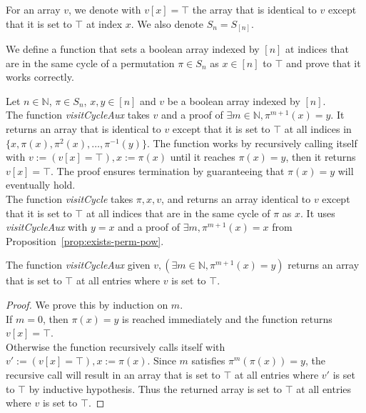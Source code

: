 For an array $v$, we denote with $v[x] = \top$ the array that is identical to $v$ except that it is set to $\top$ at index $x$. We also denote $S_n = S_{[n]}$.

We define a function that sets a boolean array indexed by $[n]$ at indices that are in the same cycle of a permutation $\pi \in S_n$ as $x \in [n]$ to $\top$ and prove that it works correctly.

\begin{definition}
  \label{def:visitCycle}
  \leanok
  Let $n \in \mathbb{N}$, $\pi \in S_n$, $x, y \in [n]$ and $v$ be a boolean array indexed by $[n]$.\\ 
  The function \emph{visitCycleAux} takes $v$ and a proof of $\exists m \in \mathbb{N}, \pi^{m + 1}(x) = y$. It returns an array that is identical to $v$ except that it is set to $\top$ at all indices in $\{x, \pi(x), \pi^2(x), \dots, \pi^{-1}(y)\}$. The function works by recursively calling itself with $v := (v[x] = \top), x := \pi(x)$ until it reaches $\pi(x) = y$, then it returns $v[x] = \top$. The proof ensures termination by guaranteeing that $\pi(x) = y$ will eventually hold.\\
  The function \emph{visitCycle} takes $\pi, x, v$, and returns an array identical to $v$ except that it is set to $\top$ at all indices that are in the same cycle of $\pi$ as $x$. It uses \emph{visitCycleAux} with $y = x$ and a proof of $\exists m, \pi^{m + 1}(x) = x$ from Proposition~\ref{prop:exists-perm-pow}.
\end{definition}

\begin{proposition}
  \label{prop:visitCycleAux-get!-true-of-get!-true}
  \leanok
  The function \emph{visitCycleAux} given $v, (\exists m \in \mathbb{N}, \pi^{m + 1}(x) = y)$ returns an array that is set to $\top$ at all entries where $v$ is set to $\top$.
\end{proposition}

\begin{proof}
  \leanok
  We prove this by induction on $m$.\\
  If $m = 0$, then $\pi(x) = y$ is reached immediately and the function returns $v[x] = \top$.\\
  Otherwise the function recursively calls itself with $v' := (v[x] = \top), x := \pi(x)$. Since $m$ satisfies $\pi^m(\pi(x)) = y$, the recursive call will result in an array that is set to $\top$ at all entries where $v'$ is set to $\top$ by inductive hypothesis. Thus the returned array is set to $\top$ at all entries where $v$ is set to $\top$.
\end{proof}

